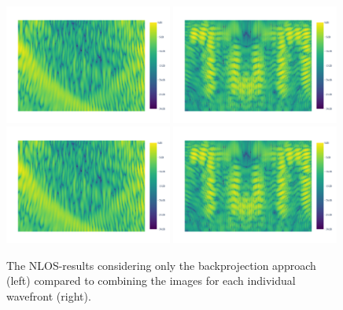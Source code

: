 \begin{figure}[ht]
    \centering
    \vspace{-1.1em} %
    \includegraphics[page=2, width=0.49\textwidth]{figures/multipath_nlos_combined_naive.pdf}
    \includegraphics[page=2, width=0.49\textwidth]{figures/multipath_nlos_combined.pdf}
    \includegraphics[page=1, width=0.49\textwidth]{figures/multipath_nlos_combined_naive.pdf}
    \includegraphics[page=1, width=0.49\textwidth]{figures/multipath_nlos_combined.pdf}
    \caption{The NLOS-results considering only the  backprojection approach (left) compared to combining the images for each individual wavefront (right).}\label{fig:MultipathNLOS_combined}
\end{figure}

